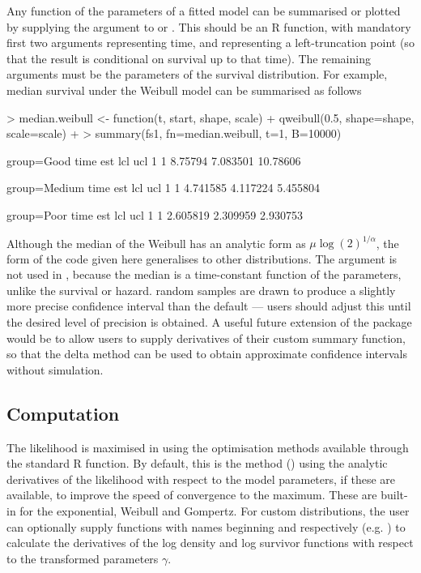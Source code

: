 \documentclass[nojss,nofooter]{jss}
\begin{document}
Any function of the parameters of a fitted model can be summarised or plotted by
supplying the argument  to  or
.  This should be an R function, with mandatory
first two arguments  representing time, and 
representing a left-truncation point (so that the result is
conditional on survival up to that time). The remaining arguments must
be the parameters of the survival distribution.  For example, median 
survival under the Weibull model  can be summarised as follows
\begin{Schunk}
\begin{Sinput}
> median.weibull <- function(t, start, shape, scale) { 
+     qweibull(0.5, shape=shape, scale=scale) 
+ }
> summary(fs1, fn=median.weibull, t=1, B=10000)
\end{Sinput}
\begin{Soutput}
group=Good 
  time     est      lcl      ucl
1    1 8.75794 7.083501 10.78606

group=Medium 
  time      est      lcl      ucl
1    1 4.741585 4.117224 5.455804

group=Poor 
  time      est      lcl      ucl
1    1 2.605819 2.309959 2.930753
\end{Soutput}
\end{Schunk}
Although the median of the Weibull has an analytic form as $\mu
\log(2)^{1/\alpha}$, the form of the code given here generalises to
other distributions.
The argument  is not used in , because
the median is a time-constant function of the parameters, unlike the
survival or hazard.   random samples are drawn to produce
a slightly more precise confidence interval than the default --- users
should adjust this until the desired level of precision is obtained.
A useful future extension of the package would be to allow users to 
supply derivatives of their custom summary function, so that the 
delta method can be used to obtain approximate confidence intervals 
without simulation.


\subsection{Computation}

The likelihood is maximised in  using the
optimisation methods available through the standard R 
function.  By default, this is the  method (\citep{nash})
using the analytic derivatives of the likelihood with respect to the
model parameters, if these are available, to improve the speed of
convergence to the maximum.  These are built-in for the exponential,
Weibull and Gompertz.  %
For custom distributions, the user can optionally supply functions
with names beginning  and  respectively
(e.g. ) to calculate the derivatives of
the log density and log survivor functions with respect to the
transformed parameters $\gamma$.
\end{document}
